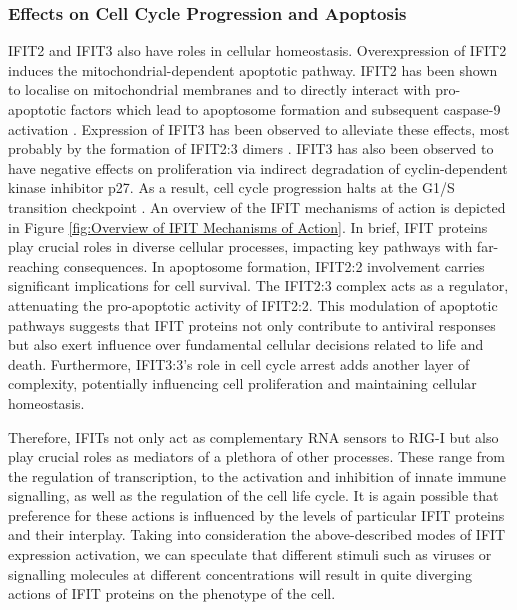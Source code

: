 \subsubsection{Effects on Cell Cycle Progression and Apoptosis} \label{Effects on Cell Cycle Progression and Apoptosis}
IFIT2 and IFIT3 also have roles in cellular homeostasis. Overexpression of IFIT2 induces the mitochondrial-dependent apoptotic pathway. IFIT2 has been shown to localise on mitochondrial membranes and to directly interact with pro-apoptotic factors which lead to apoptosome formation and subsequent caspase-9 activation \cite{Chen2017InhibitionApoptosis, Diamond2013TheProteins}. Expression of IFIT3 has been observed to alleviate these effects, most probably by the formation of IFIT2:3 dimers \cite{Mears2018BetterResponse, Stawowczyk2011TheApoptosis}. IFIT3 has also been observed to have negative effects on proliferation via indirect degradation of cyclin-dependent kinase inhibitor p27. As a result, cell cycle progression halts at the G1/S transition checkpoint \cite{Xiao2006RIG-GProteins}. An overview of the IFIT mechanisms of action is depicted in Figure \ref{fig:Overview of IFIT Mechanisms of Action}. In brief, IFIT proteins play crucial roles in diverse cellular processes, impacting key pathways with far-reaching consequences. In apoptosome formation, IFIT2:2 involvement carries significant implications for cell survival. The IFIT2:3 complex acts as a regulator, attenuating the pro-apoptotic activity of IFIT2:2. This modulation of apoptotic pathways suggests that IFIT proteins not only contribute to antiviral responses but also exert influence over fundamental cellular decisions related to life and death. Furthermore, IFIT3:3's role in cell cycle arrest adds another layer of complexity, potentially influencing cell proliferation and maintaining cellular homeostasis.

Therefore, IFITs not only act as complementary RNA sensors to RIG-I but also play crucial roles as mediators of a plethora of other processes. These range from the regulation of transcription, to the activation and inhibition of innate immune signalling, as well as the regulation of the cell life cycle. It is again possible that preference for these actions is influenced by the levels of particular IFIT proteins and their interplay. Taking into consideration the above-described modes of IFIT expression activation, we can speculate that different stimuli such as viruses or signalling molecules at different concentrations will result in quite diverging actions of IFIT proteins on the phenotype of the cell.

